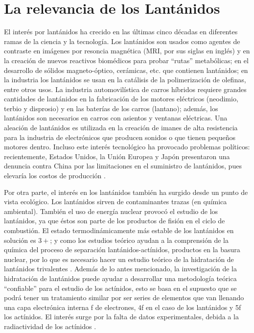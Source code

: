 \section{La relevancia de los Lant\'anidos}
El inter\'es por lant\'anidos ha crecido en las \'ultimas cinco 
d\'ecadas en diferentes ramas de la ciencia y la tecnolog\'ia. Los 
lant\'anidos son usados como agentes de contraste en im\'agenes por
resoncia magn\'etica (MRI, por sus siglas en ingl\'es) y en la 
creaci\'on de nuevos reactivos biom\'edicos para probar ``rutas'' 
metab\'olicas; en el desarrollo de s\'olidos magneto-\'optico, 
cer\'amicas, etc. que contienen lant\'anidos;  en la industria los 
lant\'anidos se usan en la cat\'alisis de la polimerizaci\'on de 
olefinas, entre otros usos. La industria automovil\'istica de carros 
h\'ibridos requiere grandes cantidades de lant\'anidos en la 
fabricaci\'on de los motores el\'ectricos (neodimio, terbio y 
disprosio) y en las bater\'ias de los carros (lantano); adem\'as, los
lant\'anidos son necesarios en carros con asientos y ventanas 
el\'ectricas. Una aleaci\'on de lant\'anidos es utilizada en la 
creaci\'on de imanes de alta resistencia para la industria de 
electr\'onicos que producen sonidos o que tienen peque\~nos motores 
dentro. Incluso este inter\'es tecnol\'ogico ha provocado problemas 
pol\'iticos: recientemente, Estados Unidos, la Uni\'on Europea y 
Jap\'on presentaron una denuncia contra China por las limitaciones en
el suministro de lant\'anidos, pues elevar\'ia los costos de 
producci\'on \citep{Ciup2010,Kuta2010,Jesk1985,Rao1989}.

Por otra parte, el inter\'es en los lant\'anidos tambi\'en ha surgido
desde un punto de vista ecol\'ogico. Los lant\'anidos sirven de 
contaminantes trazas (en qu\'imica ambiental). Tambi\'en el uso de
energ\'ia nuclear provoc\'o el estudio de los lant\'anidos, ya que 
\'estos son parte de los productos de fisi\'on en el ciclo de 
combusti\'on. 
El estado termodin\'amicamente m\'as estable de los
lant\'anidos en soluci\'on es $3+$;  y como los estudios 
te\'orico ayudan a la comprensi\'on de la qu\'imica del proceso de 
separaci\'on lant\'anidos-act\'inidos, productos en la basura 
nuclear, por lo que es necesario hacer un estudio te\'orico de la 
hidrataci\'on de lant\'anidos trivalentes . 
Adem\'as de lo antes mencionado, la investigaci\'on de la 
hidrataci\'on de lant\'anidos puede ayudar a desarrollar una 
metodolog\'ia te\'orica ``confiable'' para el estudio de los 
act\'inidos, esto se basa en el supuesto que se podr\'a tener un
tratamiento similar por ser series de elementos que van llenando una 
capa electr\'onica interna f de electrones, 4f en el caso de los 
lant\'anidos y 5f los act\'inidos. El inter\'es surge por la falta de
datos experimentales, debida a la radiactividad de los act\'inidos
\citep{Ciup2010,Kuta2010,Bunz2006}.


